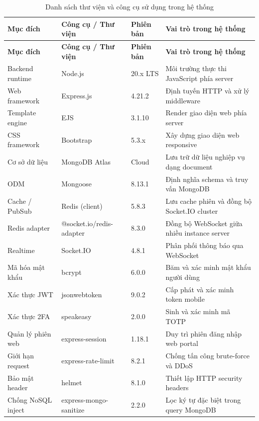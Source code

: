 \documentclass[../DoAn.tex]{subfiles}
\begin{document}
\begin{longtable}{|p{2.4cm}|p{3.6cm}|p{1.6cm}|p{5.2cm}|}
\caption{Danh sách thư viện và công cụ sử dụng trong hệ thống}
\label{tab:tools} \\
\hline
\textbf{Mục đích} & \textbf{Công cụ / Thư viện} & \textbf{Phiên bản} & \textbf{Vai trò trong hệ thống} \\
\hline
\endfirsthead

\hline
\textbf{Mục đích} & \textbf{Công cụ / Thư viện} & \textbf{Phiên bản} & \textbf{Vai trò trong hệ thống} \\
\hline
\endhead

\hline
\endfoot

Backend runtime & Node.js & 20.x LTS & Môi trường thực thi JavaScript phía server \\
\hline
Web framework & Express.js & 4.21.2 & Định tuyến HTTP và xử lý middleware \\
\hline
Template engine & EJS & 3.1.10 & Render giao diện web phía server \\
\hline
CSS framework & Bootstrap & 5.3.x & Xây dựng giao diện web responsive \\
\hline
Cơ sở dữ liệu & MongoDB Atlas & Cloud & Lưu trữ dữ liệu nghiệp vụ dạng document \\
\hline
ODM & Mongoose & 8.13.1 & Định nghĩa schema và truy vấn MongoDB \\
\hline
Cache / PubSub & Redis (client) & 5.8.3 & Lưu cache phiên và đồng bộ Socket.IO cluster \\
\hline
Redis adapter & @socket.io/redis-adapter & 8.3.0 & Đồng bộ WebSocket giữa nhiều instance server \\
\hline
Realtime & Socket.IO & 4.8.1 & Phân phối thông báo qua WebSocket \\
\hline
Mã hóa mật khẩu & bcrypt & 6.0.0 & Băm và xác minh mật khẩu người dùng \\
\hline
Xác thực JWT & jsonwebtoken & 9.0.2 & Cấp phát và xác minh token mobile \\
\hline
Xác thực 2FA & speakeasy & 2.0.0 & Sinh và xác minh mã TOTP \\
\hline
Quản lý phiên web & express-session & 1.18.1 & Duy trì phiên đăng nhập web portal \\
\hline
Giới hạn request & express-rate-limit & 8.2.1 & Chống tấn công brute-force và DDoS \\
\hline
Bảo mật header & helmet & 8.1.0 & Thiết lập HTTP security headers \\
\hline
Chống NoSQL inject & express-mongo-sanitize & 2.2.0 & Lọc ký tự đặc biệt trong query MongoDB \\

\end{longtable}
\end{document}
